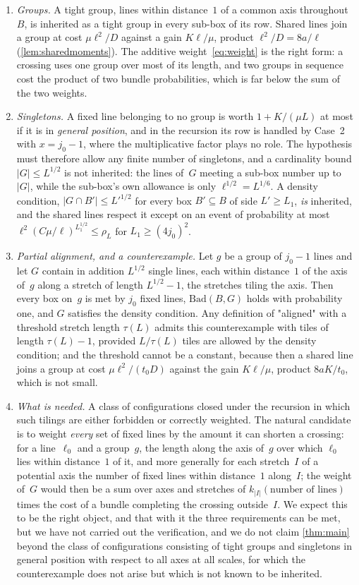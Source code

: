 \documentclass[11pt,letterpaper]{article}
\newcommand{\Bad}{\mathrm{Bad}}
\begin{document}
\begin{enumerate}
  \item \emph{Groups.} A tight group, lines within distance~$1$ of a common axis throughout~$B$, is inherited as a tight group in every sub-box of its row. Shared lines join a group at cost $\mu\ell^2/D$ against a gain $K\ell/\mu$, product $\ell^2/D=8a/\ell$ (\cref{lem:sharedmoments}). The additive weight~\eqref{eq:weight} is the right form: a crossing uses one group over most of its length, and two groups in sequence cost the product of two bundle probabilities, which is far below the sum of the two weights.
  \item \emph{Singletons.} A fixed line belonging to no group is worth $1+K/(\mu L)$ at most if it is in \emph{general position}, and in the recursion its row is handled by Case~2 with $x=j_0-1$, where the multiplicative factor plays no role. The hypothesis must therefore allow any finite number of singletons, and a cardinality bound $\lvert G\rvert\le L^{1/2}$ is not inherited: the lines of~$G$ meeting a sub-box number up to~$\lvert G\rvert$, while the sub-box's own allowance is only $\ell^{1/2}=L^{1/6}$. A density condition, $\lvert G\cap B'\rvert\le L'^{1/2}$ for every box $B'\subseteq B$ of side $L'\ge L_1$, \emph{is} inherited, and the shared lines respect it except on an event of probability at most $\ell^2(C\mu/\ell)^{L_1^{1/2}}\le\rho_L$ for $L_1\ge(4j_0)^2$.
  \item \emph{Partial alignment, and a counterexample.} Let $g$ be a group of $j_0-1$ lines and let $G$ contain in addition $L^{1/2}$ single lines, each within distance~$1$ of the axis of~$g$ along a stretch of length $L^{1/2}-1$, the stretches tiling the axis. Then every box on~$g$ is met by $j_0$ fixed lines, $\Bad(B,G)$ holds with probability one, and $G$ satisfies the density condition. Any definition of "aligned" with a threshold stretch length $\tau(L)$ admits this counterexample with tiles of length $\tau(L)-1$, provided $L/\tau(L)$ tiles are allowed by the density condition; and the threshold cannot be a constant, because then a shared line joins a group at cost $\mu\ell^2/(t_0D)$ against the gain $K\ell/\mu$, product $8aK/t_0$, which is not small.
  \item \emph{What is needed.} A class of configurations closed under the recursion in which such tilings are either forbidden or correctly weighted. The natural candidate is to weight \emph{every} set of fixed lines by the amount it can shorten a crossing: for a line~$\ell_0$ and a group~$g$, the length along the axis of~$g$ over which $\ell_0$ lies within distance~$1$ of it, and more generally for each stretch~$I$ of a potential axis the number of fixed lines within distance~$1$ along~$I$; the weight of~$G$ would then be a sum over axes and stretches of $k_{\lvert I\rvert}(\text{number of lines})$ times the cost of a bundle completing the crossing outside~$I$. We expect this to be the right object, and that with it the three requirements can be met, but we have not carried out the verification, and we do not claim \cref{thm:main} beyond the class of configurations consisting of tight groups and singletons in general position with respect to all axes at all scales, for which the counterexample does not arise but which is not known to be inherited.

\end{enumerate}
\end{document}
